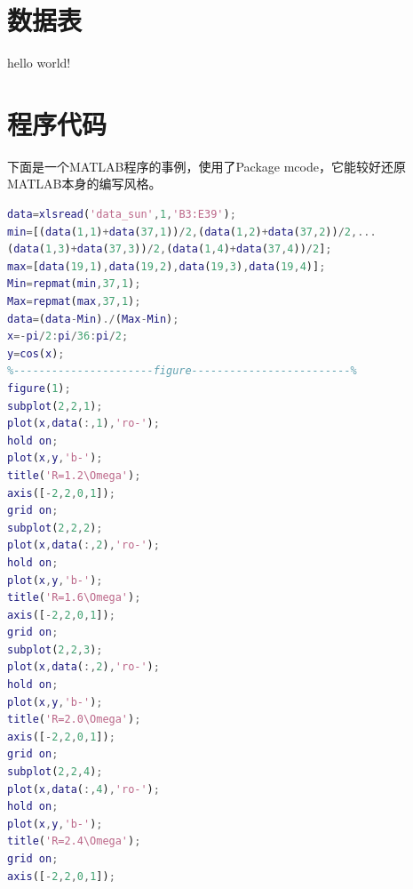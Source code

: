\documentclass[a4paper,12pt]{report}
\begin{document}
\lstset{breaklines}                %
\lstset{extendedchars=false}
\lstset{language=Matlab}
\renewcommand{\thechapter}{附录\Alph{chapter}.} 
\appendix
\begin{appendix}
	
	
\chapter{数据表}
\songti
\begin{spacing}{1.5}
	hello world!
\end{spacing}


\chapter{程序代码}
\songti
\begin{spacing}{1.5}
下面是一个MATLAB程序的事例，使用了Package mcode，它能较好还原MATLAB本身的编写风格。
\begin{lstlisting}[language={matlab}]
%The program normalizes the measurement data and compares it to the standard cosine function
data=xlsread('data_sun',1,'B3:E39');
min=[(data(1,1)+data(37,1))/2,(data(1,2)+data(37,2))/2,...
(data(1,3)+data(37,3))/2,(data(1,4)+data(37,4))/2];
max=[data(19,1),data(19,2),data(19,3),data(19,4)];
Min=repmat(min,37,1);
Max=repmat(max,37,1);
data=(data-Min)./(Max-Min);
x=-pi/2:pi/36:pi/2;
y=cos(x);
%----------------------figure-------------------------%
figure(1);
subplot(2,2,1);
plot(x,data(:,1),'ro-');
hold on;
plot(x,y,'b-');
title('R=1.2\Omega');
axis([-2,2,0,1]);
grid on;
subplot(2,2,2);
plot(x,data(:,2),'ro-');
hold on;
plot(x,y,'b-');
title('R=1.6\Omega');
axis([-2,2,0,1]);
grid on;
subplot(2,2,3);
plot(x,data(:,2),'ro-');
hold on;
plot(x,y,'b-');
title('R=2.0\Omega');
axis([-2,2,0,1]);
grid on;
subplot(2,2,4);
plot(x,data(:,4),'ro-');
hold on;
plot(x,y,'b-');
title('R=2.4\Omega');
grid on;
axis([-2,2,0,1]);
\end{lstlisting}
\end{spacing}
\end{appendix}
\end{document}
